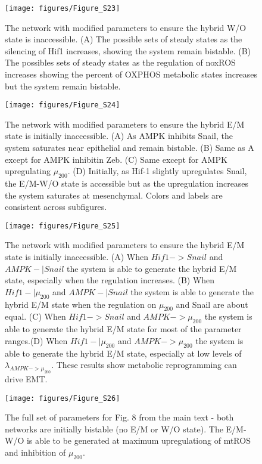 \documentclass{article}
\begin{document}
\begin{figure}
\texttt{[image: figures/Figure\_S23]}
\caption{The network with modified parameters to ensure the hybrid W/O state is inaccessible. (A) The possible sets of steady states as the silencing of Hif1 increases, showing the system remain bistable. (B) The possibles sets of  steady states as the regulation of noxROS increases showing the percent of OXPHOS metabolic states increases but the system remain bistable. }
\end{figure}
\begin{figure}
\texttt{[image: figures/Figure\_S24]}
\caption{The network with modified parameters to ensure the hybrid E/M state is initially inaccessible. (A) As AMPK inhibits Snail, the system saturates near epithelial and remain bistable. (B) Same as A except for AMPK inhibitin Zeb. (C)  Same except for AMPK upregulating $\mu_{200}$. (D) Initially, as Hif-1 slightly upregulates Snail, the E/M-W/O state is accessible but as the upregulation increases the system saturates at mesenchymal. Colors and labels are consistent across subfigures.}
\end{figure}

\begin{figure}
\texttt{[image: figures/Figure\_S25]}
\caption{The network with modified parameters to ensure the hybrid E/M state is initially inaccessible. (A) When $Hif1 -> Snail$ and $AMPK-| Snail$ the system is able to generate the hybrid E/M state, especially when the regulation increases. (B)  When $Hif1 -| \mu_{200}$ and $AMPK-| Snail$ the system is able to generate the hybrid E/M state when the regulation on $\mu_{200}$ and Snail are about equal. (C)  When $Hif1 -> Snail$ and $AMPK-> \mu_{200}$ the system is able to generate the hybrid E/M state for most of the parameter ranges.(D)  When $Hif1 -| \mu_{200}$ and $AMPK-> \mu_{200}$ the system is able to generate the hybrid E/M state, especially at low levels of $\lambda_{AMPK-> \mu_{200}}$. These results show metabolic reprogramming can drive EMT. }
\end{figure}

\begin{figure}
\texttt{[image: figures/Figure\_S26]}
\caption{The full set of parameters for Fig. 8 from the main text - both networks are initially bistable (no E/M or W/O state). The E/M-W/O is able to be generated at maximum upregulationg of mtROS and inhibition of $\mu_{200}$. }
\end{figure}
\end{document}
